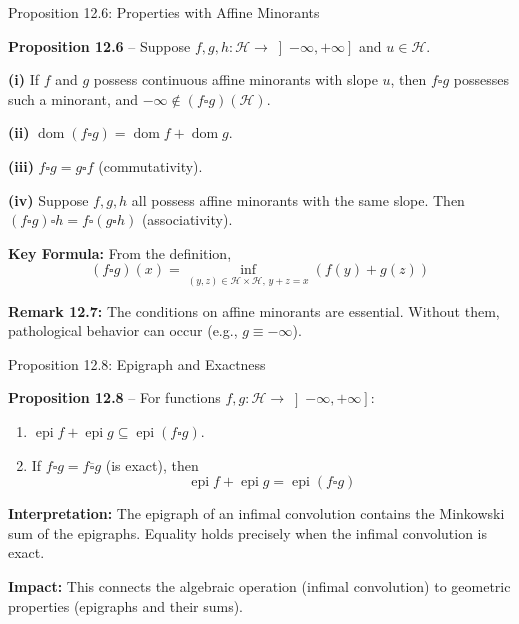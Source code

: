 \documentclass[aspectratio=169,10pt]{beamer}
\newcommand{\cH}{\mathcal{H}}
\newcommand{\dom}{\operatorname{dom}}
\newcommand{\epi}{\operatorname{epi}}
\newcommand{\co}{\square}
\begin{document}
\begin{frame}[allowframebreaks]{Proposition 12.6: Properties with Affine Minorants}

  \textbf{Proposition 12.6} -- Suppose $f, g, h: \cH \to \left]-\infty, +\infty\right]$ and $u \in \cH$.

  \textbf{(i)} If $f$ and $g$ possess continuous affine minorants with slope
  $u$, then $f \co g$ possesses such a minorant, and $-\infty \notin (f \co g)(\cH)$.

  \vspace{0.3cm}

  \textbf{(ii)} $\dom(f \co g) = \dom f + \dom g$.

  \vspace{0.3cm}

  \textbf{(iii)} $f \co g = g \co f$ (commutativity).

  \vspace{0.3cm}

  \textbf{(iv)} Suppose $f, g, h$ all possess affine minorants with the same
  slope. Then $(f \co g) \co h = f \co (g \co h)$ (associativity).

  \framebreak

  \textbf{Key Formula:} From the definition,
  \[
    (f \co g)(x) = \inf_{(y,z) \in \cH \times \cH, \, y+z=x} \left( f(y) + g(z) \right)
  \]

  \vspace{0.5cm}

  \textbf{Remark 12.7:} The conditions on affine minorants are essential.
  Without them, pathological behavior can occur (e.g., $g \equiv -\infty$).

\end{frame}

\begin{frame}{Proposition 12.8: Epigraph and Exactness}

  \textbf{Proposition 12.8} -- For functions $f, g: \cH \to \left]-\infty, +\infty\right]$:

  \begin{enumerate}
    \item[(i)] $\epi f + \epi g \subseteq \epi(f \co g)$.
    \item[(ii)] If $f \co g = f \overline{\co} g$ (is exact), then
      \[
        \epi f + \epi g = \epi(f \co g)
      \]
  \end{enumerate}

  \vspace{1cm}

  \textbf{Interpretation:} The epigraph of an infimal convolution contains the
  Minkowski sum of the epigraphs. Equality holds precisely when the
  infimal convolution is exact.

  \vspace{0.5cm}

  \textbf{Impact:} This connects the algebraic operation (infimal convolution)
  to geometric properties (epigraphs and their sums).

\end{frame}
\end{document}
